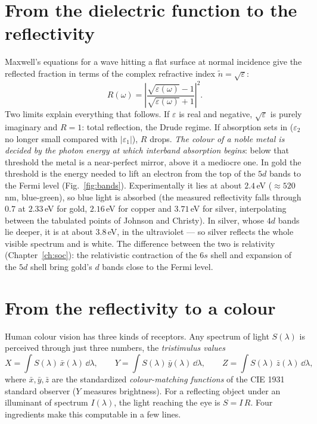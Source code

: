 \section{From the dielectric function to the reflectivity}

Maxwell's equations for a wave hitting a flat surface at normal incidence
give the reflected fraction in terms of the complex refractive index
$\tilde n = \sqrt{\varepsilon}$:
\begin{equation}
R(\omega) = \left|\frac{\sqrt{\varepsilon(\omega)} - 1}
{\sqrt{\varepsilon(\omega)} + 1}\right|^2 .
\label{eq:reflectivity}
\end{equation}
Two limits explain everything that follows. If $\varepsilon$ is real and
negative, $\sqrt\varepsilon$ is purely imaginary and $R = 1$: total
reflection, the Drude regime. If absorption sets in
($\varepsilon_2$ no longer small compared with $|\varepsilon_1|$), $R$
drops. \emph{The colour of a noble metal is decided by the photon energy
at which interband absorption begins}: below that threshold the metal is
a near-perfect mirror, above it a mediocre one. In gold the threshold is
the energy needed to lift an electron from the top of the $5d$ bands to
the Fermi level (Fig.~\ref{fig:bands}). Experimentally it lies at about
$2.4$\,eV ($\approx 520$\,nm, blue-green), so blue light is absorbed (the measured reflectivity falls through $0.7$ at
$2.33$\,eV for gold, $2.16$\,eV for copper and $3.71$\,eV for silver,
interpolating between the tabulated points of Johnson and Christy). In silver, whose $4d$ bands lie deeper, it
is at about $3.8$\,eV, in the ultraviolet --- so silver reflects the whole
visible spectrum and is white. The difference between the two is
relativity (Chapter~\ref{ch:soc}): the relativistic contraction of the
$6s$ shell and expansion of the $5d$ shell bring gold's $d$ bands close
to the Fermi level.

\section{From the reflectivity to a colour}

Human colour vision has three kinds of receptors. Any spectrum of light
$S(\lambda)$ is perceived through just three numbers, the
\emph{tristimulus values}
\begin{equation}
X = \int S(\lambda)\,\bar x(\lambda)\,\dd\lambda,\qquad
Y = \int S(\lambda)\,\bar y(\lambda)\,\dd\lambda,\qquad
Z = \int S(\lambda)\,\bar z(\lambda)\,\dd\lambda ,
\end{equation}
where $\bar x,\bar y,\bar z$ are the standardized \emph{colour-matching
functions} of the CIE 1931 standard observer ($Y$ measures brightness).
For a reflecting object under an illuminant of spectrum $I(\lambda)$, the
light reaching the eye is $S = I\,R$. Four ingredients make this
computable in a few lines.

